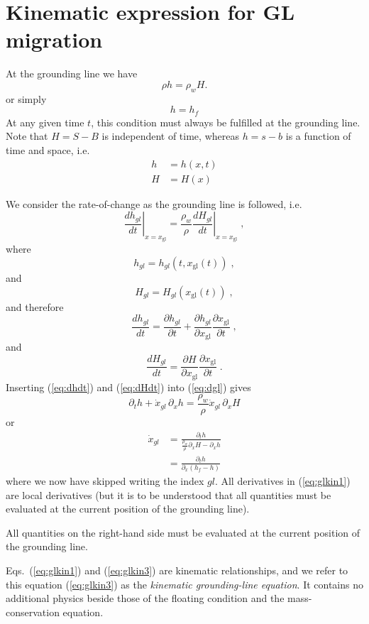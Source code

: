 \documentclass[10pt,a4paper]{book}
\newcommand{\p}{\partial}
\newcommand{\xgl}{x_{\mathrm{gl}}}
\begin{document}

\section{Kinematic expression for GL migration }

At the grounding line we have
\[
\rho h =\rho_w H.
\]
or simply
\[
 h=h_f
\]
At any given time $t$, this condition must always be fulfilled at the
grounding line.  Note that $H=S-B$ is independent of time, whereas
$h=s-b$ is a function of time and space, i.e.
\begin{align*}
 h&=h(x,t) \\
 H&=H(x)
\end{align*} 


We consider the rate-of-change as the grounding line
is followed, i.e.\
\begin{equation}
\left . \frac{d h_{gl}}{dt} \right |_{x=\xgl} = \frac{\rho_w}{\rho} \left . \frac{d H_{gl}}{dt}\right |_{x=\xgl}  \; ,
\label{eq:dgl}
\end{equation}
where
\[
h_{gl}=h_{gl}(t,\xgl(t))\;,
\] 
and
\[
H_{gl}=H_{gl}(\xgl(t))\;,
\] 
and therefore
\begin{equation}
\frac{d h_{gl}}{dt}=\frac{\p h_{gl}}{\p t} + \frac{\p h_{gl}}{\p \xgl} \frac{\p \xgl}{\p t}\;,
\label{eq:dhdt}
\end{equation}
and
\begin{equation}
\frac{d H_{gl}}{dt}=\frac{\p H}{\p \xgl} \frac{\p \xgl}{\p t}\;.
\label{eq:dHdt}
\end{equation}
Inserting (\ref{eq:dhdt}) and (\ref{eq:dHdt}) into (\ref{eq:dgl}) gives
\[
\p_t h + \dot{x}_{gl} \, \p_x h = \frac{\rho_w}{\rho} \dot{x}_{gl} \, \p_x H 
\]
or
\begin{align}
\dot{x}_{gl} & = \frac{\p_t h}{\frac{\rho_w}{\rho}\p_x H - \p_x h}  \label{eq:glkin1}\\
            & = \frac{\p_t h }{\p_x (h_f -  h)}                 \label{eq:glkin3}
\end{align}
where we now have skipped writing the index $gl$. All derivatives in
(\ref{eq:glkin1}) are local derivatives (but it is to be understood
that all quantities must be evaluated at the current position of the
grounding line). 


All quantities on the right-hand side must be evaluated at the current
position of the grounding line.  

Eqs.~(\ref{eq:glkin1}) and (\ref{eq:glkin3}) are kinematic relationships,
and we refer to this equation (\ref{eq:glkin3}) as the {\em kinematic
  grounding-line equation}. It contains no additional physics beside
those of the floating condition and the mass-conservation equation.
\end{document}
